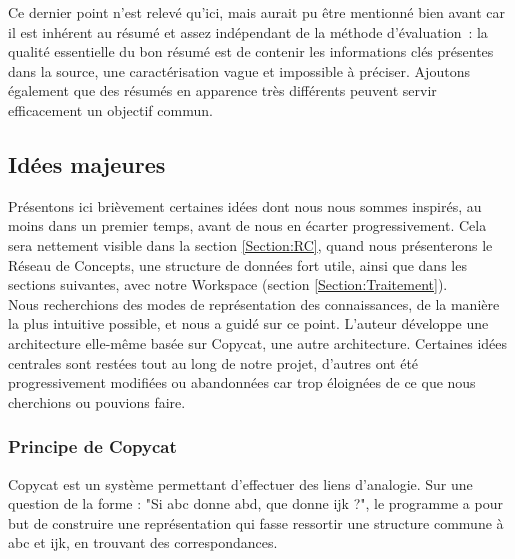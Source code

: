 \documentclass[a4paper, 12pt]{article}
\begin{document}
  Ce dernier point n'est relevé qu'ici, mais aurait pu être mentionné bien avant car il est inhérent au résumé et assez indépendant de la méthode d'évaluation~: la qualité essentielle du bon résumé est de contenir les informations clés présentes dans la source, une caractérisation vague et impossible à préciser. Ajoutons également que des résumés en apparence très différents peuvent servir efficacement un objectif commun. 
  

 
\subsection{Idées majeures}

Présentons ici brièvement certaines idées dont nous nous sommes inspirés, au moins dans un premier temps, avant de nous en écarter progressivement. Cela sera nettement visible dans la section \ref{Section:RC}, quand nous présenterons le Réseau de Concepts, une structure de données fort utile, ainsi que dans les sections suivantes, avec notre Workspace (section \ref{Section:Traitement}).\\

Nous recherchions des modes de représentation des connaissances, de la manière la plus intuitive possible, et \cite{parmentier_specification_1998} nous a guidé sur ce point. L'auteur développe une architecture elle-même basée sur Copycat, une autre architecture. Certaines idées centrales sont restées tout au long de notre projet, d'autres ont été progressivement modifiées ou abandonnées car trop éloignées de ce que nous cherchions ou pouvions faire.

\subsubsection{Principe de Copycat}

Copycat est un système permettant d'effectuer des liens d'analogie. Sur une question de la forme : "Si abc donne abd, que donne ijk ?", le programme a pour but de construire une représentation qui fasse ressortir une structure commune à abc et ijk, en trouvant des correspondances.
\end{document}
